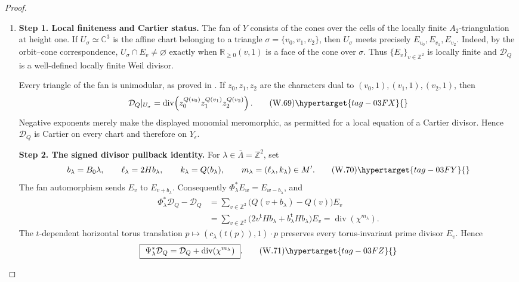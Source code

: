 \begin{proof}
\begin{enumerate}[label={$\langle1\rangle$\arabic*.},leftmargin=*]
\item 
\noindent\textbf{Step 1. Local finiteness and Cartier status.}
The fan of \(Y\) consists of the cones over the cells of the locally finite
\(A_2\)-triangulation at height one.  If
\(U_\sigma\simeq\mathbb C^3\) is the affine chart belonging to a triangle
\(\sigma=\{v_0,v_1,v_2\}\), then \(U_\sigma\) meets precisely
\(E_{v_0},E_{v_1},E_{v_2}\).  Indeed, by the orbit--cone
correspondence, \(U_\sigma\cap E_v\ne\varnothing\) exactly when
\(\mathbb R_{\geq0}(v,1)\) is a face of the cone over \(\sigma\).
Thus \(\{E_v\}_{v\in\mathbb Z^2}\) is locally finite and
\(\mathcal D_Q\) is a well-defined locally finite Weil divisor.

Every triangle of the fan is unimodular, as proved in
.  If \(z_0,z_1,z_2\) are the
characters dual to
\((v_0,1),(v_1,1),(v_2,1)\), then
\[
 \mathcal D_Q|_{U_\sigma}
 =\operatorname{div}\!
   \left(z_0^{Q(v_0)}z_1^{Q(v_1)}z_2^{Q(v_2)}\right).
\tag{W.69}\hypertarget{tag-03FX}{}\label{wbII:eq:W:5.17ab}
\]
Negative exponents merely make the displayed monomial meromorphic, as
permitted for a local equation of a Cartier divisor.  Hence
\(\mathcal D_Q\) is Cartier on every chart and therefore on
\(Y_\epsilon\).

\noindent\textbf{Step 2. The signed divisor pullback identity.}
For \(\lambda\in\bar\Lambda=\mathbb Z^2\), set
\[
 b_\lambda=B_0\lambda,
 \qquad
 \ell_\lambda=2Hb_\lambda,
 \qquad
 k_\lambda=Q(b_\lambda),
 \qquad
 m_\lambda=(\ell_\lambda,k_\lambda)\in M'.
\tag{W.70}\hypertarget{tag-03FY}{}\label{wbII:eq:W:5.17ac}
\]
The fan automorphism sends \(E_v\) to \(E_{v+b_\lambda}\).
Consequently \(\Phi_\lambda^*E_w=E_{w-b_\lambda}\), and
\begin{align*}
 \Phi_\lambda^*\mathcal D_Q-\mathcal D_Q
 &=\sum_{v\in\mathbb Z^2}
   \bigl(Q(v+b_\lambda)-Q(v)\bigr)E_v\\
 &=\sum_{v\in\mathbb Z^2}
   \bigl(2v^{\mathsf t}Hb_\lambda+
         b_\lambda^{\mathsf t}Hb_\lambda\bigr)E_v
 =\operatorname{div}(\chi^{m_\lambda}).
\end{align*}
The \(t\)-dependent horizontal torus translation
\(p\mapsto(c_\lambda(t(p)),1)\cdot p\) preserves every
torus-invariant prime divisor \(E_v\).  Hence
\[
 \boxed{\ 
 \Psi_\lambda^*\mathcal D_Q
 =\mathcal D_Q+\operatorname{div}(\chi^{m_\lambda})\ }.
\tag{W.71}\hypertarget{tag-03FZ}{}\label{wbII:eq:W:5.17ad}
\]


\end{enumerate}
\end{proof}

